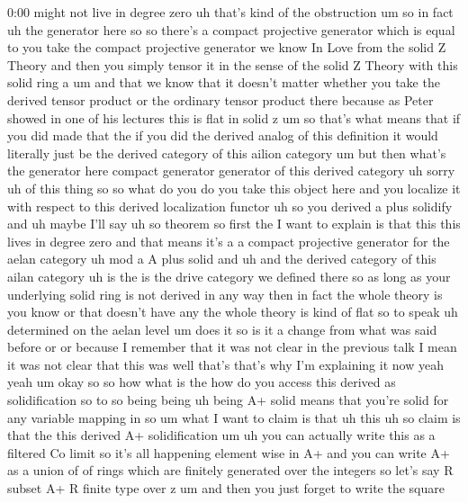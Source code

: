 \begin{unfinished}{0:00}
might  not  live  in  degree  zero  uh  that's
kind  of  the  obstruction  um  so  in  fact  uh
the  generator  here
so  so  there's  a  compact  projective
generator
which  is  equal  to  you  take  the  compact
projective  generator  we  know  In  Love
from  the  solid  Z  Theory  and  then  you
simply  tensor  it  in  the  sense  of  the
solid  Z  Theory  with  this  solid  ring
a  um  and  that  we  know  that  it  doesn't
matter  whether  you  take  the  derived
tensor  product  or  the  ordinary  tensor
product  there  because  as  Peter  showed  in
one  of  his  lectures  this  is  flat  in
solid
z  um
so  that's  what  means  that  if  you  did
made  that  the  if  you  did  the  derived
analog  of  this  definition  it  would
literally  just  be  the  derived  category
of  this  ailion
category  um  but  then  what's  the
generator
here  compact  generator  generator  of  this
derived  category  uh  sorry  uh  of  this
thing
so  so  what  do  you  do  you  take  this
object  here  and  you  localize  it  with
respect  to  this  derived  localization
functor
uh  so  you  derived  a  plus
solidify  and  uh  maybe  I'll  say  uh  so
theorem  so  first  the  I  want  to  explain
is  that  this  this  lives  in  degree
zero
and  that  means  it's  a  a  compact
projective
generator  for  the  aelan
category  uh  mod  a  A  plus
solid  and  uh  and  the  derived  category  of
this  ailan
category  uh  is  the  is  the  drive
category  we  defined
there  so
as  long  as  your  underlying  solid  ring  is
not  derived  in  any  way  then  in  fact  the
whole  theory  is  you  know  or  that  doesn't
have  any  the  whole  theory  is  kind  of
flat  so  to  speak  uh  determined  on  the
aelan  level
um  does  it  so  is  it  a  change  from  what
was  said  before  or  or  because  I  remember
that  it  was  not
clear
in  the  previous  talk  I
mean  it  was  not  clear  that  this
was  well  that's  that's  why  I'm
explaining  it  now  yeah  yeah
um  okay  so  so  how  what  is  the  how  do  you
access  this  derived  as  solidification
so  to
so  being  being  uh  being  A+  solid  means
that  you're  solid  for  any  variable
mapping  in  so  um  what  I  want  to  claim  is
that  uh  this  uh  so
claim  is  that  the  this  derived  A+
solidification
um  uh  you  can  actually  write  this  as  a
filtered  Co  limit  so  it's  all  happening
element  wise  in  A+  and  you  can  write  A+
as  a  union  of  of  rings  which  are
finitely  generated  over  the  integers  so
let's  say  R  subset  A+  R  finite  type  over
z  um  and
then  you  just  forget  to  write  the  square

\end{unfinished}
